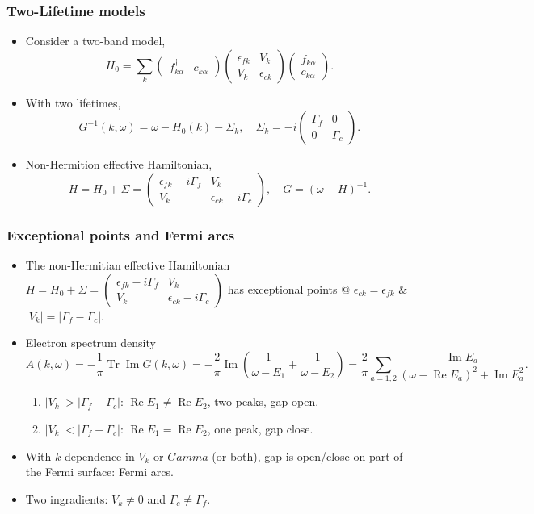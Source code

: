 \documentclass[xcolor=table, 10pt, aspectratio=169]{beamer}
\DeclareMathOperator{\tr}{Tr}
\DeclareMathOperator{\im}{Im}
\DeclareMathOperator{\re}{Re}
\begin{document}
\begin{frame}
\frametitle{Two-Lifetime models}
\begin{itemize}
\item Consider a two-band model,
\[H_0=\sum_k\begin{pmatrix}f_{k\alpha}^\dagger&c_{k\alpha}^\dagger\end{pmatrix}
\begin{pmatrix}\epsilon_{fk} & V_k\\ V_k & \epsilon_{ck}\end{pmatrix}
\begin{pmatrix}f_{k\alpha}\\c_{k\alpha}\end{pmatrix}.\]
\item With two lifetimes,
\[G^{-1}(k,\omega)=\omega-H_0(k)-\Sigma_k,\quad
\Sigma_k=-i\begin{pmatrix}\Gamma_f & 0\\0 & \Gamma_c\end{pmatrix}.\]
\item Non-Hermition effective Hamiltonian,
\[H = H_0+\Sigma = \begin{pmatrix}
\epsilon_{fk} - i\Gamma_f & V_k\\ V_k & \epsilon_{ck} - i\Gamma_c
\end{pmatrix}, \quad G=(\omega-H)^{-1}.\]
\end{itemize}
\end{frame}

\begin{frame}
\frametitle{Exceptional points and Fermi arcs}
\begin{itemize}
\item The non-Hermitian effective Hamiltonian $H = H_0+\Sigma = \begin{pmatrix}
\epsilon_{fk} - i\Gamma_f & V_k\\ V_k & \epsilon_{ck} - i\Gamma_c
\end{pmatrix}$ has {\color{blue}exceptional points} @ $\epsilon_{ck}=\epsilon_{fk}$ \&
$|V_k|=|\Gamma_f-\Gamma_c|$.
\item Electron spectrum density
\[A(k, \omega)=-\frac1\pi\tr\im G(k, \omega)
=-\frac2\pi\im\left(
\frac1{\omega-E_1}+\frac1{\omega-E_2}\right)
=\frac2\pi\sum_{a=1,2}\frac{\im E_a}{(\omega-\re E_a)^2+\im E_a^2}.\]
\begin{enumerate}
\item $|V_k|>|\Gamma_f-\Gamma_c|$: $\re E_1\neq\re E_2$, two peaks, gap open.
\item $|V_k|<|\Gamma_f-\Gamma_c|$: $\re E_1=\re E_2$, one peak, gap close.
\end{enumerate}
\item With $k$-dependence in $V_k$ or $Gamma$ (or both), gap is open/close on part of the Fermi surface: {\color{blue}Fermi arcs}.
\item Two ingradients: $V_k\neq0$ and $\Gamma_c\neq\Gamma_f$.
\end{itemize}
\end{frame}
\end{document}
